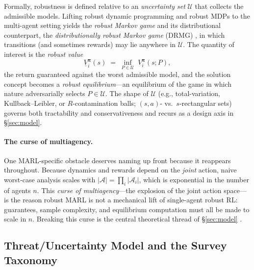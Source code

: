 Formally, robustness is defined relative to an \emph{uncertainty set}
$\mathcal{U}$ that collects the admissible models. Lifting robust dynamic
programming and robust MDPs \cite{nilim2005robust,iyengar2005robust} to the
multi-agent setting yields the \emph{robust Markov game} and its distributional
counterpart, the \emph{distributionally robust Markov game} (DRMG)
\cite{zhang2020,shi2024sample}, in which transitions (and sometimes rewards) may
lie anywhere in $\mathcal{U}$. The quantity of interest is the \emph{robust value}
\[
\underline{V}_i^{\boldsymbol{\pi}}(s)
\;=\; \inf_{P\in\mathcal{U}}\; V_i^{\boldsymbol{\pi}}(s; P),
\]
the return guaranteed against the worst admissible model, and the solution concept
becomes a \emph{robust equilibrium}---an equilibrium of the game in which nature
adversarially selects $P\in\mathcal{U}$. The shape of $\mathcal{U}$ (e.g.,
total-variation, Kullback--Leibler, or $R$-contamination balls; $(s,a)$- vs.\
$s$-rectangular sets) governs both tractability and conservativeness and recurs as
a design axis in \S\ref{sec:model}.

\paragraph{The curse of multiagency.} One MARL-specific obstacle deserves naming
up front because it reappears throughout. Because dynamics and rewards depend on
the \emph{joint} action, naive worst-case analysis scales with
$|\mathcal{A}|=\prod_{i}|\mathcal{A}_i|$, which is exponential in the number of
agents $n$. This \emph{curse of multiagency}---the explosion of the joint
action space---is the reason robust MARL is not a mechanical lift of single-agent
robust RL: guarantees, sample complexity, and equilibrium computation must all be
made to scale in $n$. Breaking this curse is the central theoretical thread of
\S\ref{sec:model} \cite{shi2024breaking,qu2026distributionally}.

\subsection{Threat/Uncertainty Model and the Survey Taxonomy}
\label{sec:bg-taxonomy}

